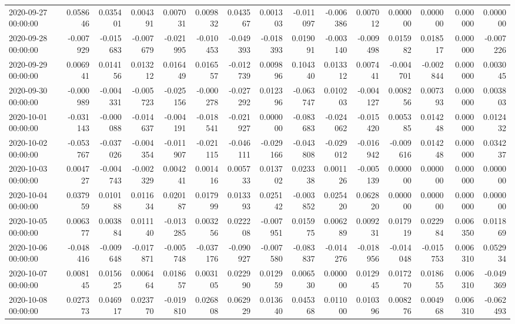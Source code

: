 \begin{tabular}{lrrrrrrrrrrrrrr}
2020-09-27 00:00:00 & 0.058646 & 0.035401 & 0.004391 & 0.007031 & 0.009832 & 0.043567 & 0.001303 & -0.011097 & -0.006386 & 0.007012 & 0.000000 & 0.000000 & 0.000000 & 0.000000 \\
2020-09-28 00:00:00 & -0.007929 & -0.015683 & -0.007679 & -0.021995 & -0.010453 & -0.049393 & -0.018393 & 0.019091 & -0.003140 & -0.009498 & 0.015982 & 0.018517 & 0.000000 & -0.007226 \\
2020-09-29 00:00:00 & 0.006941 & 0.014156 & 0.013212 & 0.016449 & 0.016557 & -0.012739 & 0.009896 & 0.104340 & 0.013312 & 0.007441 & -0.004701 & -0.002844 & 0.000000 & 0.003045 \\
2020-09-30 00:00:00 & -0.000989 & -0.004331 & -0.005723 & -0.025156 & -0.000278 & -0.027292 & 0.012396 & -0.063747 & 0.010203 & -0.004127 & 0.008256 & 0.007393 & 0.000000 & 0.003803 \\
2020-10-01 00:00:00 & -0.031143 & -0.000088 & -0.014637 & -0.004191 & -0.018541 & -0.021927 & 0.000000 & -0.083683 & -0.024062 & -0.015420 & 0.005385 & 0.014248 & 0.000000 & 0.012432 \\
2020-10-02 00:00:00 & -0.053767 & -0.037026 & -0.004354 & -0.011907 & -0.021115 & -0.046111 & -0.029166 & -0.043808 & -0.029012 & -0.016942 & -0.009616 & 0.014248 & 0.000000 & 0.034237 \\
2020-10-03 00:00:00 & 0.004727 & -0.004743 & -0.002329 & 0.004241 & 0.001416 & 0.005733 & 0.013702 & 0.023338 & 0.001126 & -0.005139 & 0.000000 & 0.000000 & 0.000000 & 0.000000 \\
2020-10-04 00:00:00 & 0.037959 & 0.010188 & 0.011634 & 0.020187 & 0.017999 & 0.013393 & 0.025142 & -0.003852 & 0.025420 & 0.062820 & 0.000000 & 0.000000 & 0.000000 & 0.000000 \\
2020-10-05 00:00:00 & 0.006377 & 0.003884 & 0.011140 & -0.013285 & 0.003256 & 0.022208 & -0.007951 & 0.015975 & 0.006289 & 0.009231 & 0.017919 & 0.022984 & 0.006350 & 0.011869 \\
2020-10-06 00:00:00 & -0.048416 & -0.009648 & -0.017871 & -0.005748 & -0.037176 & -0.090927 & -0.007580 & -0.083837 & -0.014276 & -0.018956 & -0.014048 & -0.015753 & 0.006310 & 0.052934 \\
2020-10-07 00:00:00 & 0.008145 & 0.015625 & 0.006464 & 0.018657 & 0.003105 & 0.022990 & 0.012959 & 0.006530 & 0.000000 & 0.012945 & 0.017270 & 0.018655 & 0.006310 & -0.049369 \\
2020-10-08 00:00:00 & 0.027373 & 0.046917 & 0.023770 & -0.019810 & 0.026808 & 0.062929 & 0.013640 & 0.045368 & 0.011000 & 0.010396 & 0.008276 & 0.004968 & 0.006310 & -0.062493 \\

\end{tabular}
